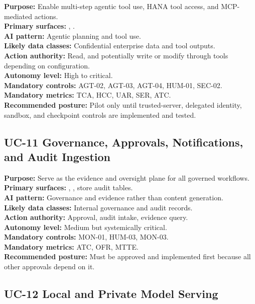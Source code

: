 \documentclass[11pt,a4paper]{article}
\begin{document}
\textbf{Purpose:} Enable multi-step agentic tool use, HANA tool access, and MCP-mediated actions.\\
\textbf{Primary surfaces:} , .\\
\textbf{AI pattern:} Agentic planning and tool use.\\
\textbf{Likely data classes:} Confidential enterprise data and tool outputs.\\
\textbf{Action authority:} Read, and potentially write or modify through tools depending on configuration.\\
\textbf{Autonomy level:} High to critical.\\
\textbf{Mandatory controls:} AGT-02, AGT-03, AGT-04, HUM-01, SEC-02.\\
\textbf{Mandatory metrics:} TCA, HCC, UAR, SER, ATC.\\
\textbf{Recommended posture:} Pilot only until trusted-server, delegated identity, sandbox, and checkpoint controls are implemented and tested.

\subsection{UC-11 Governance, Approvals, Notifications, and Audit Ingestion}

\textbf{Purpose:} Serve as the evidence and oversight plane for all governed workflows.\\
\textbf{Primary surfaces:} , , store audit tables.\\
\textbf{AI pattern:} Governance and evidence rather than content generation.\\
\textbf{Likely data classes:} Internal governance and audit records.\\
\textbf{Action authority:} Approval, audit intake, evidence query.\\
\textbf{Autonomy level:} Medium but systemically critical.\\
\textbf{Mandatory controls:} MON-01, HUM-03, MON-03.\\
\textbf{Mandatory metrics:} ATC, OFR, MTTE.\\
\textbf{Recommended posture:} Must be approved and implemented first because all other approvals depend on it.

\subsection{UC-12 Local and Private Model Serving}
\end{document}
